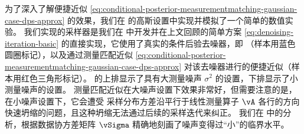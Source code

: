 \documentclass[../../book-main_zh.tex]{subfiles}
\begin{document}
为了深入了解便捷近似 \eqref{eq:conditional-posterior-measurementmatching-gaussian-case-dps-approx} 的效果，我们在  的高斯设置中实现并模拟了一个简单的数值实验。
我们实现的采样器是我们在  中开发并在上文回顾的简单方案 \eqref{eq:denoising-iteration-basic} 的直接实现，它使用了真实的条件后验去噪器，即 （样本用蓝色圆圈标记），以及通过测量匹配近似 \eqref{eq:conditional-posterior-measurementmatching-gaussian-case-dps-approx} 对该去噪器进行的便捷近似（样本用红色三角形标记）。
 的上排显示了具有大测量噪声 $\sigma^2$ 的设置，下排显示了小测量噪声的设置。
测量匹配近似在大噪声设置下效果非常好，但需要注意的是，在小噪声设置下，它会遭受
采样分布方差沿平行于线性测量算子 $\vA$ 各行的方向快速坍缩的问题，且这种坍缩无法通过后续的采样迭代来纠正。
我们在  中的分析，根据数据协方差矩阵 $\vSigma$ 精确地刻画了噪声变得过“小”的临界水平。
\end{document}
